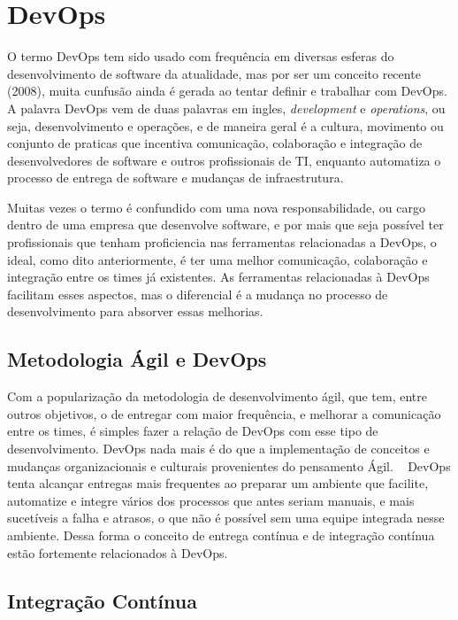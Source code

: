 \section{DevOps}
\label{sec:devops}

O termo DevOps tem sido usado com frequência em diversas esferas do
desenvolvimento de software da atualidade, mas por ser um conceito recente
(2008), muita cunfusão ainda é gerada ao tentar definir e trabalhar com DevOps.
A palavra DevOps vem de duas palavras em ingles, \textit{development} e \textit{operations},
ou seja, desenvolvimento e operações, e de maneira geral é a cultura, movimento
ou conjunto de praticas que incentiva comunicação, colaboração e integração de
desenvolvedores de software e outros profissionais de TI, enquanto automatiza o
processo de entrega de software e mudanças de infraestrutura. ~\cite{loukides2012devops}~\cite{erich2014mapping}

Muitas vezes o termo é confundido com uma nova responsabilidade, ou cargo
dentro de uma empresa que desenvolve software, e por mais que seja possível
ter profissionais que tenham proficiencia nas ferramentas relacionadas a
DevOps, o ideal, como dito anteriormente, é ter uma melhor comunicação,
colaboração e integração entre os times já existentes. As ferramentas
relacionadas à DevOps facilitam esses aspectos, mas o diferencial é a
mudança no processo de desenvolvimento para absorver essas melhorias.

\subsection{Metodologia Ágil e DevOps}

Com a popularização da metodologia de desenvolvimento ágil, que tem, entre outros
objetivos, o de entregar com maior frequência, e melhorar a comunicação entre os
times, é simples fazer a relação de DevOps com esse tipo de desenvolvimento.
DevOps nada mais é do que a implementação de conceitos e mudanças organizacionais
e culturais provenientes do pensamento Ágil. ~\cite{scott2014} DevOps tenta
alcançar entregas mais frequentes ao preparar um ambiente que facilite,
automatize e integre vários dos processos que antes seriam manuais, e mais
sucetíveis a falha e atrasos, o que não é possível sem uma equipe integrada
nesse ambiente. Dessa forma o conceito de entrega contínua e de integração
contínua estão fortemente relacionados à DevOps.

\subsection{Integração Contínua}

